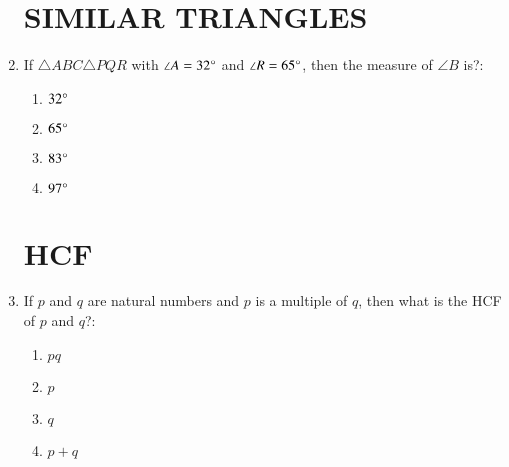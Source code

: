 \documentclass[12pt-letter paper]{article}
\begin{document}
\begin{enumerate}
\begin{center}
\section*{SIMILAR TRIANGLES}        
\end{center}
\item If $\triangle ABC  \triangle PQR$ with $\angle A = 32\degree $ and $\angle R = 65\degree$, then the measure of $\angle B$ is?:
\begin{enumerate}
\item $ 32\degree $                                                
\item $ 65\degree $                                            
\item $ 83\degree $                                
\item $ 97\degree $
\end{enumerate}                                          
\begin{center}                                    
\section*{HCF}        
\end{center}
\item If $p$ and $q$ are natural numbers and $p$ is a multiple of $q$, then what is the HCF of $p$ and $q$?:
\begin{enumerate}
\item $ pq $  
\item $ p $                                        
\item $ q $                              
\item $ p+q $
\end{enumerate}                                    
\begin{center}                                    

\end{center}
\end{enumerate}
\end{document}
